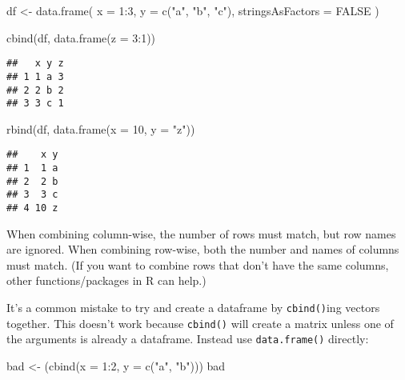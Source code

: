 \documentclass[
]{book}
\newenvironment{Shaded}{\begin{snugshade}}{\end{snugshade}}
\newcommand{\AttributeTok}[1]{\textcolor[rgb]{0.77,0.63,0.00}{#1}}
\newcommand{\ConstantTok}[1]{\textcolor[rgb]{0.00,0.00,0.00}{#1}}
\newcommand{\DecValTok}[1]{\textcolor[rgb]{0.00,0.00,0.81}{#1}}
\newcommand{\FunctionTok}[1]{\textcolor[rgb]{0.00,0.00,0.00}{#1}}
\newcommand{\NormalTok}[1]{#1}
\newcommand{\OtherTok}[1]{\textcolor[rgb]{0.56,0.35,0.01}{#1}}
\newcommand{\SpecialCharTok}[1]{\textcolor[rgb]{0.00,0.00,0.00}{#1}}
\newcommand{\StringTok}[1]{\textcolor[rgb]{0.31,0.60,0.02}{#1}}
\begin{document}
\begin{Shaded}
\begin{Highlighting}[]
\NormalTok{df }\OtherTok{\textless{}{-}} \FunctionTok{data.frame}\NormalTok{(}
  \AttributeTok{x =} \DecValTok{1}\SpecialCharTok{:}\DecValTok{3}\NormalTok{,}
  \AttributeTok{y =} \FunctionTok{c}\NormalTok{(}\StringTok{"a"}\NormalTok{, }\StringTok{"b"}\NormalTok{, }\StringTok{"c"}\NormalTok{),}
  \AttributeTok{stringsAsFactors =} \ConstantTok{FALSE}
\NormalTok{)}

\FunctionTok{cbind}\NormalTok{(df, }\FunctionTok{data.frame}\NormalTok{(}\AttributeTok{z =} \DecValTok{3}\SpecialCharTok{:}\DecValTok{1}\NormalTok{))}
\end{Highlighting}
\end{Shaded}

\begin{verbatim}
##   x y z
## 1 1 a 3
## 2 2 b 2
## 3 3 c 1
\end{verbatim}

\begin{Shaded}
\begin{Highlighting}[]
\FunctionTok{rbind}\NormalTok{(df, }\FunctionTok{data.frame}\NormalTok{(}\AttributeTok{x =} \DecValTok{10}\NormalTok{, }\AttributeTok{y =} \StringTok{"z"}\NormalTok{))}
\end{Highlighting}
\end{Shaded}

\begin{verbatim}
##    x y
## 1  1 a
## 2  2 b
## 3  3 c
## 4 10 z
\end{verbatim}

When combining column-wise, the number of rows must match, but row names are ignored. When combining row-wise, both the number and names of columns must match. (If you want to combine rows that don't have the same columns, other functions/packages in R can help.)

It's a common mistake to try and create a dataframe by \texttt{cbind()}ing vectors together. This doesn't work because \texttt{cbind()} will create a matrix unless one of the arguments is already a dataframe. Instead use \texttt{data.frame()} directly:

\begin{Shaded}
\begin{Highlighting}[]
\NormalTok{bad }\OtherTok{\textless{}{-}}\NormalTok{ (}\FunctionTok{cbind}\NormalTok{(}\AttributeTok{x =} \DecValTok{1}\SpecialCharTok{:}\DecValTok{2}\NormalTok{, }\AttributeTok{y =} \FunctionTok{c}\NormalTok{(}\StringTok{"a"}\NormalTok{, }\StringTok{"b"}\NormalTok{)))}
\NormalTok{bad}
\end{Highlighting}
\end{Shaded}
\end{document}
